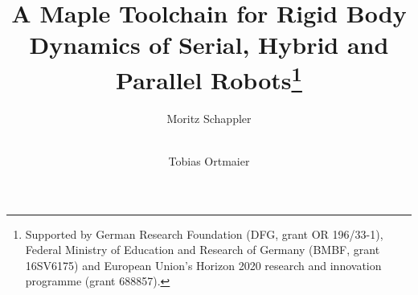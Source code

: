 \documentclass[runningheads]{llncs}
\begin{document}
%
\title{A Maple Toolchain for Rigid Body Dynamics of Serial, Hybrid and Parallel Robots\thanks{Supported by German Research Foundation (DFG, grant OR 196/33-1), Federal Ministry of Education and Research of Germany (BMBF, grant 16SV6175) and European Union's Horizon 2020 research and innovation programme (grant 688857).}}
%
%
\author{Moritz Schappler \and \\
Tobias Ortmaier}
%
%
%
\maketitle              %
%

\end{document}
